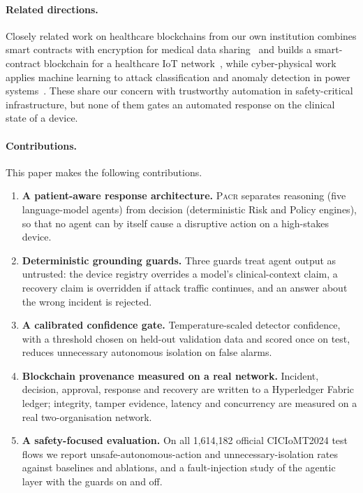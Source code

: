 \documentclass[preprint,12pt]{elsarticle}
\newcommand{\pacr}{\textsc{Pacr}}
\begin{document}
\paragraph{Related directions.}
Closely related work on healthcare blockchains from our own institution combines smart contracts with encryption for medical data sharing~\cite{vidhya2023} and builds a smart-contract blockchain for a healthcare IoT network~\cite{mukhopadhyay2021}, while cyber-physical work applies machine learning to attack classification and anomaly detection in power systems~\cite{pranav2026,vignes2025}. These share our concern with trustworthy automation in safety-critical infrastructure, but none of them gates an automated response on the clinical state of a device.

\paragraph{Contributions.}
This paper makes the following contributions.
\begin{enumerate}
  \item \textbf{A patient-aware response architecture.} \pacr{} separates reasoning (five language-model agents) from decision (deterministic Risk and Policy engines), so that no agent can by itself cause a disruptive action on a high-stakes device.
  \item \textbf{Deterministic grounding guards.} Three guards treat agent output as untrusted: the device registry overrides a model's clinical-context claim, a recovery claim is overridden if attack traffic continues, and an answer about the wrong incident is rejected.
  \item \textbf{A calibrated confidence gate.} Temperature-scaled detector confidence, with a threshold chosen on held-out validation data and scored once on test, reduces unnecessary autonomous isolation on false alarms.
  \item \textbf{Blockchain provenance measured on a real network.} Incident, decision, approval, response and recovery are written to a Hyperledger Fabric ledger; integrity, tamper evidence, latency and concurrency are measured on a real two-organisation network.
  \item \textbf{A safety-focused evaluation.} On all 1,614,182 official CICIoMT2024 test flows we report unsafe-autonomous-action and unnecessary-isolation rates against baselines and ablations, and a fault-injection study of the agentic layer with the guards on and off.
\end{enumerate}
\end{document}

